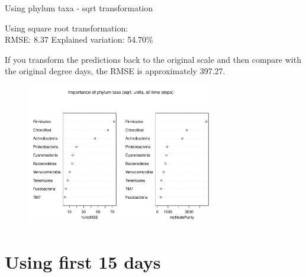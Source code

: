 \documentclass{beamer}
\begin{document}
\begin{frame}{Using phylum taxa - sqrt transformation}

  {\scriptsize
    
  \noindent Using square root transformation:\\
  RMSE: 8.37  \hspace{0.05in}  Explained variation: 54.70\%

  \vspace{0.05in}
  
  \noindent If you transform the predictions back to the original
  scale and then compare with the original degree days, the RMSE is
  approximately 397.27.
  
\begin{center}
\begin{figure}
  \includegraphics[width=3.25in]{../only_phyla/all_time_steps/sqrt_units_all_data_phyla_imp_plot}
\end{figure}
\end{center}
\vspace{-0.25in}
}
  
\end{frame}




\section[First 15 days]{Using first 15 days}
\end{document}
